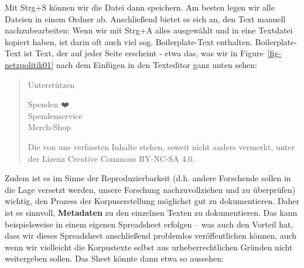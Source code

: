 \documentclass[
  letterpaper,
  DIV=11,
  numbers=noendperiod]{scrreprt}
\begin{document}
Mit Strg+S können wir die Datei dann speichern. Am besten legen wir alle
Dateien in einem Ordner ab. Anschließend bietet es sich an, den Text
manuell nachzubearbeiten: Wenn wir mit Strg+A alles ausgewählt und in
eine Textdatei kopiert haben, ist darin oft auch viel sog.
Boilerplate-Text enthalten. Boilerplate-Text ist Text, der auf jeder
Seite erscheint - etwa das, was wir in Figure~\ref{fig-netzpolitik01}
nach dem Einfügen in den Texteditor ganz unten sehen:

\begin{quote}
Unterstützen

Spenden ❤️\\
Spendenservice\\
Merch-Shop

Die von uns verfassten Inhalte stehen, soweit nicht anders vermerkt,
unter der Lizenz Creative Commons BY-NC-SA 4.0.
\end{quote}

Zudem ist es im Sinne der Reproduzierbarkeit (d.h. andere Forschende
sollen in die Lage versetzt werden, unsere Forschung nachzuvollziehen
und zu überprüfen) wichtig, den Prozess der Korpuserstellung möglichst
gut zu dokumentieren. Daher ist es sinnvoll, \textbf{Metadaten} zu den
einzelnen Texten zu dokumentieren. Das kann beispielsweise in einem
eigenen Spreadsheet erfolgen -- was auch den Vorteil hat, dass wir
dieses Spreadsheet anschließend problemlos veröffentlichen können, auch
wenn wir vielleicht die Korpustexte selbst aus urheberrechtlichen
Gründen nicht weitergeben sollen. Das Sheet könnte dann etwa so
aussehen:
\end{document}
